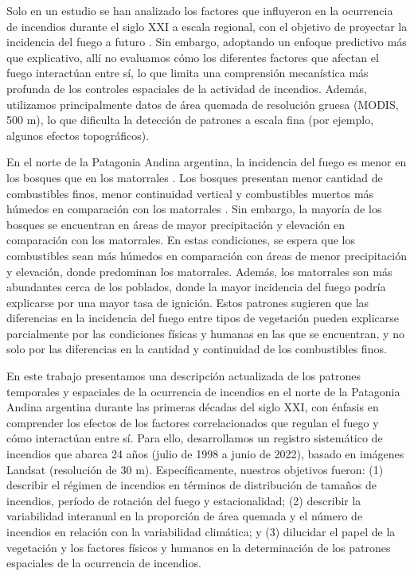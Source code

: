 Solo en un estudio se han analizado los factores que influyeron en la ocurrencia de incendios durante el siglo XXI a escala regional, con el objetivo de proyectar la incidencia del fuego a futuro \citep{kitzberger_projections_2022}. Sin embargo, adoptando un enfoque predictivo más que explicativo, allí no evaluamos cómo los diferentes factores que afectan el fuego interactúan entre sí, lo que limita una comprensión mecanística más profunda de los controles espaciales de la actividad de incendios. Además, utilizamos principalmente datos de área quemada de resolución gruesa (MODIS, 500 m), lo que dificulta la detección de patrones a escala fina (por ejemplo, algunos efectos topográficos).

En el norte de la Patagonia Andina argentina, la incidencia del fuego es menor en los bosques que en los matorrales \citep{mermoz_landscape_2005, paritsis_positive_2015, morales_stochastic_2015, tiribelli_non-additive_2019, kitzberger_projections_2022}. Los bosques presentan menor cantidad de combustibles finos, menor continuidad vertical y combustibles muertos más húmedos en comparación con los matorrales \citep{paritsis_positive_2015, tiribelli_changes_2018, barbera_microclimate_2023}. Sin embargo, la mayoría de los bosques se encuentran en áreas de mayor precipitación y elevación en comparación con los matorrales. En estas condiciones, se espera que los combustibles sean más húmedos en comparación con áreas de menor precipitación y elevación, donde predominan los matorrales. Además, los matorrales son más abundantes cerca de los poblados, donde la mayor incidencia del fuego podría explicarse por una mayor tasa de ignición. Estos patrones sugieren que las diferencias en la incidencia del fuego entre tipos de vegetación pueden explicarse parcialmente por las condiciones físicas y humanas en las que se encuentran, y no solo por las diferencias en la cantidad y continuidad de los combustibles finos.

En este trabajo presentamos una descripción actualizada de los patrones temporales y espaciales de la ocurrencia de incendios en el norte de la Patagonia Andina argentina durante las primeras décadas del siglo XXI, con énfasis en comprender los efectos de los factores correlacionados que regulan el fuego y cómo interactúan entre sí. Para ello, desarrollamos un registro sistemático de incendios que abarca 24 años (julio de 1998 a junio de 2022), basado en imágenes Landsat (resolución de 30 m). Específicamente, nuestros objetivos fueron: (1) describir el régimen de incendios en términos de distribución de tamaños de incendios, período de rotación del fuego y estacionalidad; (2) describir la variabilidad interanual en la proporción de área quemada y el número de incendios en relación con la variabilidad climática; y (3) dilucidar el papel de la vegetación y los factores físicos y humanos en la determinación de los patrones espaciales de la ocurrencia de incendios.

